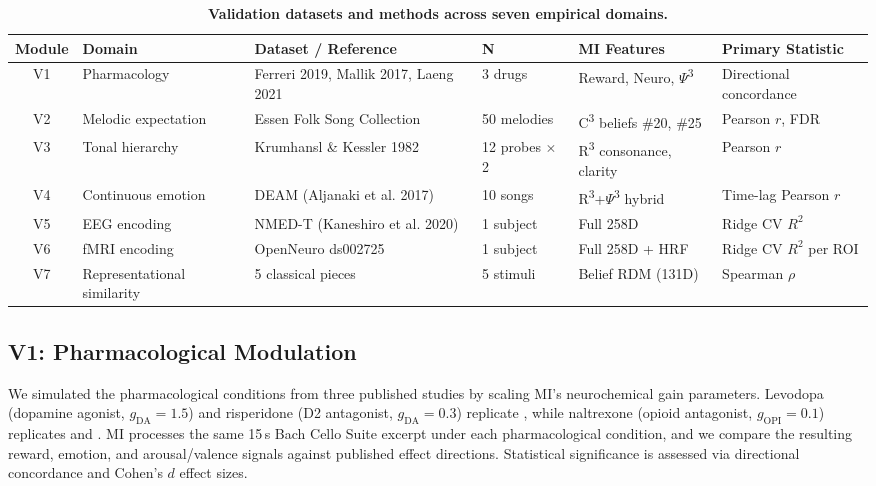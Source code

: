 \documentclass[twocolumn,10pt]{article}
\newcommand{\rthree}{R\textsuperscript{3}}
\newcommand{\cthree}{C\textsuperscript{3}}
\newcommand{\psithree}{\ensuremath{\Psi}\textsuperscript{3}}
\begin{document}
\begin{table}[t]
\centering
\caption{\textbf{Validation datasets and methods across seven empirical domains.}}
\label{tab:datasets}
\small
\begin{tabular}{@{}clllll@{}}
\toprule
\textbf{Module} & \textbf{Domain} & \textbf{Dataset / Reference} & \textbf{N} & \textbf{MI Features} & \textbf{Primary Statistic} \\
\midrule
V1 & Pharmacology & Ferreri 2019, Mallik 2017, Laeng 2021 & 3 drugs & Reward, Neuro, \psithree{} & Directional concordance \\
V2 & Melodic expectation & Essen Folk Song Collection & 50 melodies & \cthree{} beliefs \#20, \#25 & Pearson $r$, FDR \\
V3 & Tonal hierarchy & Krumhansl \& Kessler 1982 & 12 probes $\times$ 2 & \rthree{} consonance, clarity & Pearson $r$ \\
V4 & Continuous emotion & DEAM (Aljanaki et al. 2017) & 10 songs & \rthree{}+\psithree{} hybrid & Time-lag Pearson $r$ \\
V5 & EEG encoding & NMED-T (Kaneshiro et al. 2020) & 1 subject & Full 258D & Ridge CV $R^2$ \\
V6 & fMRI encoding & OpenNeuro ds002725 & 1 subject & Full 258D + HRF & Ridge CV $R^2$ per ROI \\
V7 & Representational similarity & 5 classical pieces & 5 stimuli & Belief RDM (131D) & Spearman $\rho$ \\
\bottomrule
\end{tabular}
\end{table}

\subsection{V1: Pharmacological Modulation}

We simulated the pharmacological conditions from three published studies by scaling MI's neurochemical gain parameters. Levodopa (dopamine agonist, $g_{\text{DA}} = 1.5$) and risperidone (D2 antagonist, $g_{\text{DA}} = 0.3$) replicate \citet{ferreri2019}, while naltrexone (opioid antagonist, $g_{\text{OPI}} = 0.1$) replicates \citet{mallik2017} and \citet{laeng2021}. MI processes the same 15\,s Bach Cello Suite excerpt under each pharmacological condition, and we compare the resulting reward, emotion, and arousal/valence signals against published effect directions. Statistical significance is assessed via directional concordance and Cohen's $d$ effect sizes.
\end{document}
